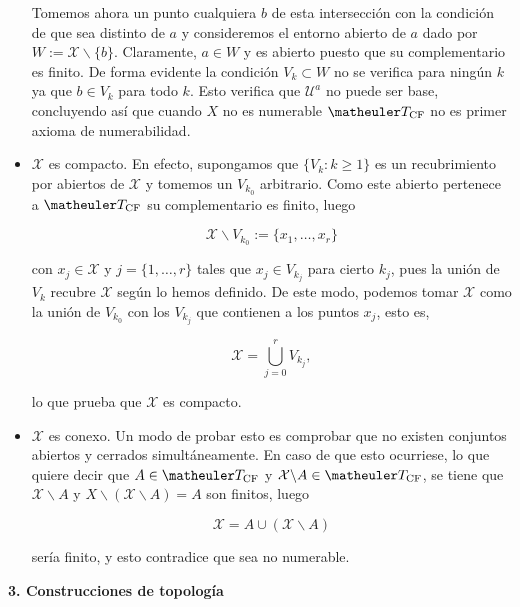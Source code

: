 \begin{itemize}
Tomemos ahora un punto cualquiera $b$ de esta intersección con la condición de que sea distinto de $a$ y consideremos el entorno abierto de $a$ dado por $W:=\mathcal{X}\backslash \{b\}$. Claramente, $a\in W$ y es abierto puesto que su complementario es finito.  De forma evidente la condición $V_k \subset W$ no se verifica para ningún $k$ ya que $b\in V_k$ para todo $k$. Esto verifica que $\mathcal{U}^a$ no puede ser base, concluyendo así que cuando $X$ no es numerable $\T_{\text{CF}}$ no es primer axioma de numerabilidad.

\item $\mathcal{X}$ es compacto. En efecto, supongamos que $\{V_k : k \geq 1\}$ es un recubrimiento por abiertos de $\mathcal{X}$ y tomemos un $V_{k_0}$ arbitrario. Como este abierto pertenece a $\T_{\text{CF}}$ su complementario es finito, luego 

\[\mathcal{X} \backslash V_{k_0} := \{x_1, \ldots, x_r\}\]

con $x_j \in \mathcal{X}$ y $j=\{1,\ldots, r\}$ tales que $x_j\in V_{k_j}$ para cierto $k_j$, pues la unión de $V_k$ recubre $\mathcal{X}$ según lo hemos definido. De este modo, podemos tomar $\mathcal{X}$ como la unión de $V_{k_0}$ con los $V_{k_j}$ que contienen a los puntos $x_j$, esto es,

\[\mathcal{X}=\bigcup_{j=0}^r V_{k_j},\]

lo que prueba que $\mathcal{X}$ es compacto. 

\item $\mathcal{X}$ es conexo. Un modo de probar esto es comprobar que no existen conjuntos abiertos y cerrados simultáneamente. En caso de que esto ocurriese, lo que quiere decir que $A\in \T_{\text{CF}}$ y $\mathcal{X}\backslash A \in \T_{\text{CF}}$, se tiene que $\mathcal{X} \backslash A$ y $X\backslash (\mathcal{X}\backslash A)=A$ son finitos, luego

\[\mathcal{X}=A \cup (\mathcal{X}\backslash A)\]

sería finito, y esto contradice que sea no numerable. 

\end{itemize}



















\textbf{3. Construcciones de topología} \\

